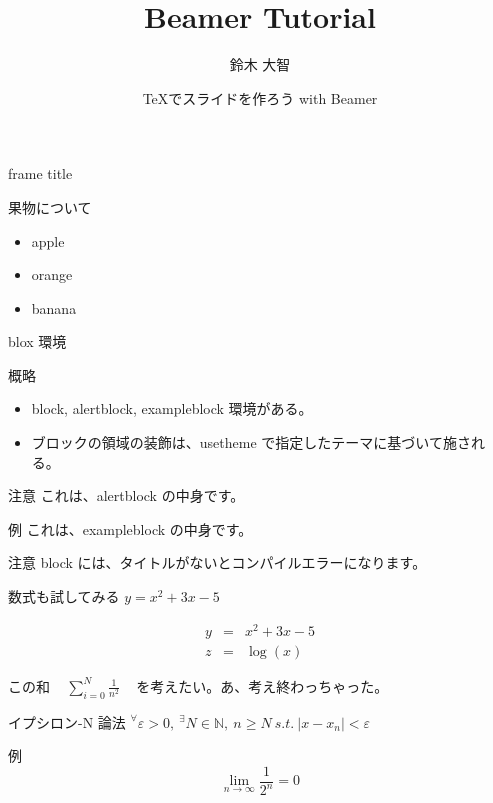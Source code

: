 \documentclass[dvipdfmx, 12pt]{beamer}  %
\title{Beamer Tutorial}
\author{鈴木 大智}
\date[2021/02/23]{\TeX でスライドを作ろう with Beamer}
\institute[日本大学大学院]{日本大学大学院 理工学研究科 数学専攻}
\begin{document}
\frame{\maketitle}

\begin{frame}{frame title}

  果物について
  
  \begin{itemize}
    \item apple
    \item orange
    \item banana
  \end{itemize}
\end{frame}

\begin{frame}{blox 環境}

  \begin{block}{概略}
    \begin{itemize}
      \item block, alertblock, exampleblock 環境がある。
      \item ブロックの領域の装飾は、usetheme で指定したテーマに基づいて施される。
    \end{itemize}
  \end{block}

  \begin{alertblock}{注意}
    これは、alertblock の中身です。
  \end{alertblock}

  \begin{exampleblock}{例}
    これは、exampleblock の中身です。
  \end{exampleblock}

  \begin{alertblock}{注意}
    block には、タイトルがないとコンパイルエラーになります。
  \end{alertblock}

\end{frame}


\begin{frame}{数式も試してみる}
  $y = x^2 + 3x -5$

  \begin{eqnarray*}
    y &=& x^2 + 3x -5 \\
    z &=& \log(x)
  \end{eqnarray*}

  この和 ~ $ {\displaystyle
    \sum_{i=0}^{N} \frac{1}{n^2}
  } $ ~ を考えたい。あ、考え終わっちゃった。

  \begin{block}{ イプシロン-N 論法 }
    $ {\displaystyle
      {}^{\forall} \varepsilon > 0, ~ {}^{\exists} N \in \mathbb{N}, ~ n \geq N ~
      s.t. ~ | x - x_n | < \varepsilon
    } $
  \end{block}

  \begin{exampleblock}{例}
    \begin{displaymath}
      \lim_{n \rightarrow \infty} \frac{1}{2^n} = 0
    \end{displaymath}
  \end{exampleblock}

\end{frame}
\end{document}
